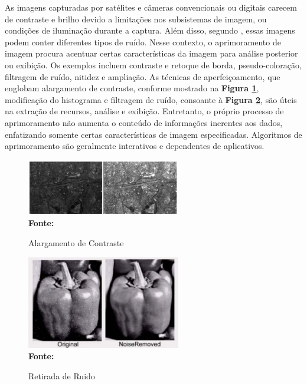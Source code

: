 As imagens capturadas por satélites e câmeras convencionais ou digitais carecem de contraste e brilho devido a limitações nos subsistemas de imagem, ou condições de iluminação durante a captura. Além disso, segundo , essas imagens podem conter diferentes tipos de ruído. Nesse contexto, o aprimoramento de imagem procura acentuar certas características da imagem para análise posterior ou exibição. Os exemplos incluem contraste e retoque de borda, pseudo-coloração, filtragem de ruído, nitidez e ampliação. As técnicas de aperfeiçoamento, que englobam alargamento de contraste, conforme mostrado na \textbf{Figura \ref{fig:figura1}}, modificação do histograma e filtragem de ruído, consoante à \textbf{Figura \ref{fig:figura2}}, são úteis na extração de recursos, análise e exibição. Entretanto, o próprio processo de aprimoramento não aumenta o conteúdo de informações inerentes aos dados, enfatizando somente certas características de imagem especificadas. Algoritmos de aprimoramento são geralmente interativos e dependentes de aplicativos.

 \begin{figure}[ht]
 	\centering	
 	\caption[\hspace{0.1cm}Grade Computacional.]{Alargamento de Contraste}
 	\vspace{-0.4cm}
 	\includegraphics[width=0.6\textwidth]{figuras/Alargamento de Contraste.png}
 	\captionsetup{justification=centering}
	\vspace{-0.2cm}
	\\\textbf{\footnotesize Fonte: \cite{techniques} }
	\label{fig:figura1}
\end{figure}

 \begin{figure}[ht]
 	\centering	
 	\caption[\hspace{0.1cm}Grade Computacional.]{Retirada de Ruido}
 	\vspace{-0.4cm}
 	\includegraphics[width=0.6\textwidth]{figuras/Retirada de Ruido.png}
 	\captionsetup{justification=centering}
	\vspace{-0.2cm}
	\\\textbf{\footnotesize Fonte: \cite{techniques} }
	\label{fig:figura2}
\end{figure}



